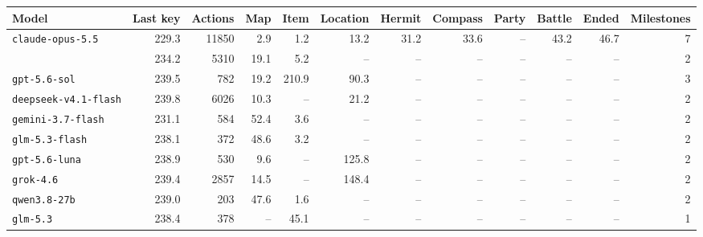 \begin{tabular}{@{}lrrrrrrrrrrr@{}}
\toprule
Model & Last key & Actions & Map & Item & Location & Hermit & Compass & Party & Battle & Ended & Milestones \\
\midrule
\texttt{claude-opus-5.5} & 229.3 & 11850 & 2.9 & 1.2 & 13.2 & 31.2 & 33.6 & -- & 43.2 & 46.7 & 7 \\
 & 234.2 & 5310 & 19.1 & 5.2 & -- & -- & -- & -- & -- & -- & 2 \\
\texttt{gpt-5.6-sol} & 239.5 & 782 & 19.2 & 210.9 & 90.3 & -- & -- & -- & -- & -- & 3 \\
\texttt{deepseek-v4.1-flash} & 239.8 & 6026 & 10.3 & -- & 21.2 & -- & -- & -- & -- & -- & 2 \\
\texttt{gemini-3.7-flash} & 231.1 & 584 & 52.4 & 3.6 & -- & -- & -- & -- & -- & -- & 2 \\
\texttt{glm-5.3-flash} & 238.1 & 372 & 48.6 & 3.2 & -- & -- & -- & -- & -- & -- & 2 \\
\texttt{gpt-5.6-luna} & 238.9 & 530 & 9.6 & -- & 125.8 & -- & -- & -- & -- & -- & 2 \\
\texttt{grok-4.6} & 239.4 & 2857 & 14.5 & -- & 148.4 & -- & -- & -- & -- & -- & 2 \\
\texttt{qwen3.8-27b} & 239.0 & 203 & 47.6 & 1.6 & -- & -- & -- & -- & -- & -- & 2 \\
\texttt{glm-5.3} & 238.4 & 378 & -- & 45.1 & -- & -- & -- & -- & -- & -- & 1 \\
\bottomrule
\end{tabular}
